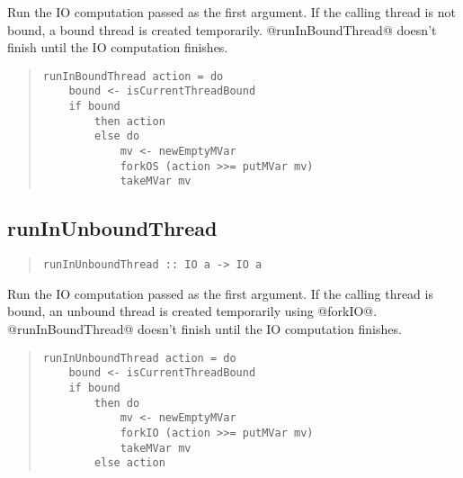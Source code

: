 \documentclass[a4paper,twoside]{article}
\begin{document}
Run the IO computation passed as the first argument. If the calling thread
is not bound, a bound thread is created temporarily. @runInBoundThread@
doesn't finish until the IO computation finishes.

\begin{quote}
\begin{verbatim}
runInBoundThread action = do
    bound <- isCurrentThreadBound
    if bound
        then action
        else do
            mv <- newEmptyMVar
            forkOS (action >>= putMVar mv)
            takeMVar mv
\end{verbatim}
\end{quote}


\subsection{runInUnboundThread}

\begin{quote}
\begin{verbatim}
runInUnboundThread :: IO a -> IO a
\end{verbatim}
\end{quote}

Run the IO computation passed as the first argument. If the calling thread
is bound, an unbound thread is created temporarily using @forkIO@.
@runInBoundThread@ doesn't finish until the IO computation finishes.

\begin{quote}
\begin{verbatim}
runInUnboundThread action = do
    bound <- isCurrentThreadBound
    if bound
        then do
            mv <- newEmptyMVar
            forkIO (action >>= putMVar mv)
            takeMVar mv
        else action
\end{verbatim}
\end{quote}        
        
\end{document}
